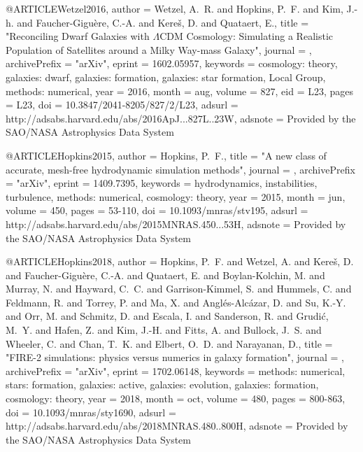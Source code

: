 \documentclass[twocolumn,tighten]{aastex63}
\begin{document}
{{{{{@ARTICLE{Wetzel2016,
   author = {{Wetzel}, A.~R. and {Hopkins}, P.~F. and {Kim}, J.-h. and {Faucher-Gigu{\`e}re}, C.-A. and 
	{Kere{\v s}}, D. and {Quataert}, E.},
    title = "{Reconciling Dwarf Galaxies with {$\Lambda$}CDM Cosmology: Simulating a Realistic Population of Satellites around a Milky Way-mass Galaxy}",
  journal = {\apjl},
archivePrefix = "arXiv",
   eprint = {1602.05957},
 keywords = {cosmology: theory, galaxies: dwarf, galaxies: formation, galaxies: star formation, Local Group, methods: numerical},
     year = 2016,
    month = aug,
   volume = 827,
      eid = {L23},
    pages = {L23},
      doi = {10.3847/2041-8205/827/2/L23},
   adsurl = {http://adsabs.harvard.edu/abs/2016ApJ...827L..23W},
  adsnote = {Provided by the SAO/NASA Astrophysics Data System}
}

@ARTICLE{Hopkins2015,
   author = {{Hopkins}, P.~F.},
    title = "{A new class of accurate, mesh-free hydrodynamic simulation methods}",
  journal = {\mnras},
archivePrefix = "arXiv",
   eprint = {1409.7395},
 keywords = {hydrodynamics, instabilities, turbulence, methods: numerical, cosmology: theory},
     year = 2015,
    month = jun,
   volume = 450,
    pages = {53-110},
      doi = {10.1093/mnras/stv195},
   adsurl = {http://adsabs.harvard.edu/abs/2015MNRAS.450...53H},
  adsnote = {Provided by the SAO/NASA Astrophysics Data System}
}

@ARTICLE{Hopkins2018,
   author = {{Hopkins}, P.~F. and {Wetzel}, A. and {Kere{\v s}}, D. and {Faucher-Gigu{\`e}re}, C.-A. and 
	{Quataert}, E. and {Boylan-Kolchin}, M. and {Murray}, N. and 
	{Hayward}, C.~C. and {Garrison-Kimmel}, S. and {Hummels}, C. and 
	{Feldmann}, R. and {Torrey}, P. and {Ma}, X. and {Angl{\'e}s-Alc{\'a}zar}, D. and 
	{Su}, K.-Y. and {Orr}, M. and {Schmitz}, D. and {Escala}, I. and 
	{Sanderson}, R. and {Grudi{\'c}}, M.~Y. and {Hafen}, Z. and 
	{Kim}, J.-H. and {Fitts}, A. and {Bullock}, J.~S. and {Wheeler}, C. and 
	{Chan}, T.~K. and {Elbert}, O.~D. and {Narayanan}, D.},
    title = "{FIRE-2 simulations: physics versus numerics in galaxy formation}",
  journal = {\mnras},
archivePrefix = "arXiv",
   eprint = {1702.06148},
 keywords = {methods: numerical, stars: formation, galaxies: active, galaxies: evolution, galaxies: formation, cosmology: theory},
     year = 2018,
    month = oct,
   volume = 480,
    pages = {800-863},
      doi = {10.1093/mnras/sty1690},
   adsurl = {http://adsabs.harvard.edu/abs/2018MNRAS.480..800H},
  adsnote = {Provided by the SAO/NASA Astrophysics Data System}
}

}}}}}
\end{document}
